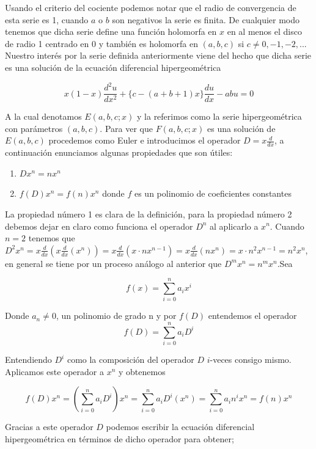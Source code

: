 Usando el criterio del cociente podemos notar que el radio de convergencia de esta serie es 1, cuando $a$ o $b$ son negativos  la serie es finita. De cualquier modo tenemos que dicha serie define una funci\'on holomorfa en $x$ en al menos el disco de radio 1 centrado en 0 y tambi\'en es holomorfa en $(a,b,c)$ si $c \neq 0, -1, -2,...$ \\

Nuestro inter\'es por la serie definida anteriormente viene del hecho que dicha serie es una soluci\'on de la ecuaci\'on diferencial hipergeom\'etrica

$$ x(1-x)\frac{d^{2}u}{dx^{2}} + \lbrace c- (a+b+1)x \rbrace \frac{du}{dx} -abu=0 $$

 A la cual denotamos $E(a,b,c;x)$ y la referimos como la serie hipergeom\'etrica con par\'ametros $(a,b,c)$. Para ver que $F(a,b,c;x)$ es una soluci\'on de $E(a,b,c)$ procedemos como Euler e introducimos el operador $ D = x \frac{d}{dx}$, a continuaci\'on  enunciamos algunas  propiedades que son \'utiles:


\begin{enumerate}
\item $Dx^{n}= nx^{n}$
\item $f(D)x^{n}=f(n)x^{n}$ donde $f$ es un polinomio de coeficientes constantes
\end{enumerate}

La propiedad n\'umero 1 es clara de la definici\'on, para la propiedad n\'umero 2 debemos dejar en claro como funciona el operador $D^{n}$ al aplicarlo a $x^{n}$. Cuando $n=2$ tenemos que $D^{2} x^{n} = x\frac{d}{dx} (x\frac{d}{dx} (x^{n}) )= x\frac{d}{dx}(x \cdot nx^{n-1})=x\frac{d}{dx} (nx^{n} ) = x\cdot n^{2}x^{n-1}=n^{2}x^{n}$, en general se tiene por un proceso an\'alogo al anterior que $D^{m}x^{n}=n^{m}x^{n}$.Sea

$$ f(x)= \sum_{i=0}^{n} a_{i}x^{i} $$

Donde $a_{n} \neq 0$, un polinomio de grado n y por $f(D)$ entendemos el operador $$f(D) = \sum_{i=0}^{n} a_{i}D^{i}$$

Entendiendo $D^{i}$ como la composici\'on del operador $D$ $i$-veces consigo mismo. Aplicamos este operador a $x^{n}$ y obtenemos

$$f(D)x^{n}=(\sum_{i=0}^{n}a_{i}D^{i}) x^{n} = \sum_{i=0}^{n}a_{i} D^{i}( x^{n}) = \sum_{i=0}^{n}a_{i}n^{i}x^{n} = f(n)x^{n}   $$


Gracias a este operador $D$ podemos escribir la ecuaci\'on diferencial hipergeom\'etrica en t\'erminos de dicho operador para obtener;

